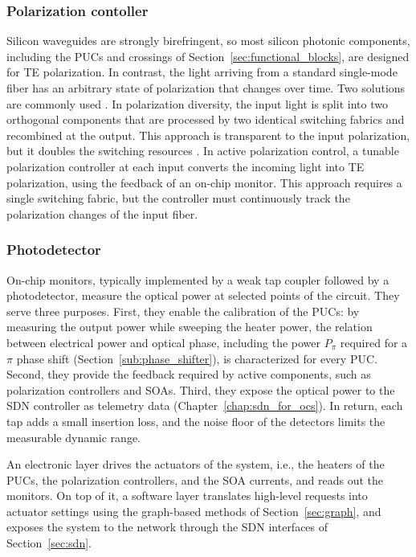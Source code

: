 \subsubsection{Polarization contoller}\label{sub:pol_controller}
Silicon waveguides are strongly birefringent, so most silicon photonic components, including the PUCs and crossings of Section~\ref{sec:functional_blocks}, are designed for TE polarization.
In contrast, the light arriving from a standard single-mode fiber has an arbitrary state of polarization that changes over time.
Two solutions are commonly used \cite{Shahwar2024Polarization}.
In polarization diversity, the input light is split into two orthogonal components that are processed by two identical switching fabrics and recombined at the output.
This approach is transparent to the input polarization, but it doubles the switching resources \cite{tanizawa2016novelpola, kurosu2019high}.
In active polarization control, a tunable polarization controller at each input converts the incoming light into TE polarization, using the feedback of an on-chip monitor.
This approach requires a single switching fabric, but the controller must continuously track the polarization changes of the input fiber.
\subsubsection{Photodetector}\label{sub:pd}
On-chip monitors, typically implemented by a weak tap coupler followed by a photodetector, measure the optical power at selected points of the circuit.
They serve three purposes.
First, they enable the calibration of the PUCs: by measuring the output power while sweeping the heater power, the relation between electrical power and optical phase, including the power $P_\pi$ required for a $\pi$ phase shift (Section~\ref{sub:phase_shifter}), is characterized for every PUC.
Second, they provide the feedback required by active components, such as polarization controllers and SOAs.
Third, they expose the optical power to the SDN controller as telemetry data (Chapter~\ref{chap:sdn_for_ocs}).
In return, each tap adds a small insertion loss, and the noise floor of the detectors limits the measurable dynamic range.

An electronic layer drives the actuators of the system, i.e., the heaters of the PUCs, the polarization controllers, and the SOA currents, and reads out the monitors.
On top of it, a software layer translates high-level requests into actuator settings using the graph-based methods of Section~\ref{sec:graph}, and exposes the system to the network through the SDN interfaces of Section~\ref{sec:sdn}.

